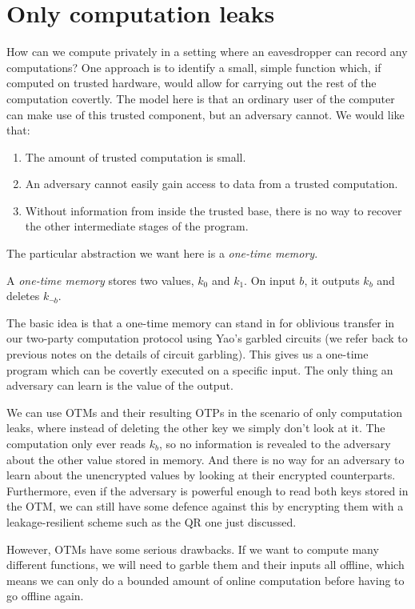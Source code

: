 \documentclass[10pt]{article}
\begin{document}
\section{Only computation leaks}

How can we compute privately in a setting where an eavesdropper can record any computations? One approach is to identify a small, simple function which, if computed on trusted hardware, would allow for carrying out the rest of the computation covertly. The model here is that an ordinary user of the computer can make use of this trusted component, but an adversary cannot. We would like that:
\begin{enumerate}
\item The amount of trusted computation is small.
\item An adversary cannot easily gain access to data from a trusted computation.
\item Without information from inside the trusted base, there is no way to recover the other intermediate stages of the program.
\end{enumerate}

The particular abstraction we want here is a \emph{one-time memory}.

\begin{definition}
A \emph{one-time memory} stores two values, $k_0$ and $k_1$. On input $b$, it outputs $k_b$ and deletes $k_{\neg b}$.
\end{definition}

The basic idea is that a one-time memory can stand in for oblivious transfer in our two-party computation protocol using Yao's garbled circuits (we refer back to previous notes on the details of circuit garbling). This gives us a one-time program which can be covertly executed on a specific input. The only thing an adversary can learn is the value of the output.

We can use OTMs and their resulting OTPs in the scenario of only computation leaks, where instead of deleting the other key we simply don't look at it. The computation only ever reads $k_b$, so no information is revealed to the adversary about the other value stored in memory. And there is no way for an adversary to learn about the unencrypted values by looking at their encrypted counterparts. Furthermore, even if the adversary is powerful enough to read both keys stored in the OTM, we can still have some defence against this by encrypting them with a leakage-resilient scheme such as the QR one just discussed.

However, OTMs have some serious drawbacks. If we want to compute many different functions, we will need to garble them and their inputs all offline, which means we can only do a bounded amount of online computation before having to go offline again.


\nocite{*}


\end{document}
